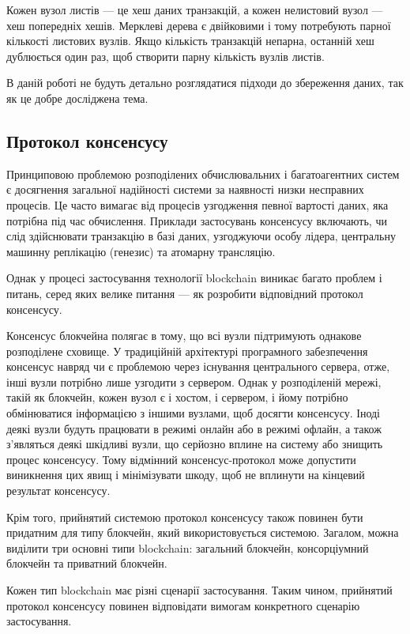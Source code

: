 \documentclass{lib/styles/default-style}
\begin{document}
    Кожен вузол листів --- це хеш даних транзакцій,
    а кожен нелистовий вузол --- хеш попередніх хешів.
    Мерклеві дерева є двійковими і тому потребують парної кількості листових вузлів.
    Якщо кількість транзакцій непарна, останній хеш дублюється один раз,
    щоб створити парну кількість вузлів листів.

    В даній роботі не будуть детально розглядатися підходи до збереження даних, так як це добре досліджена тема.
    
\subsection{Протокол консенсусу}

    Принциповою проблемою розподілених обчислювальних і багатоагентних систем
    є досягнення загальної надійності системи за наявності низки несправних процесів.
    Це часто вимагає від процесів узгодження певної вартості даних, яка потрібна під час обчислення.
    Приклади застосувань консенсусу включають, чи слід здійснювати транзакцію в базі даних, узгоджуючи особу лідера,
    центральну машинну реплікацію (генезис) та атомарну трансляцію.
    
    Однак у процесі застосування технології blockchain виникає багато проблем і питань,
    серед яких велике питання --- як розробити відповідний протокол консенсусу.

    Консенсус блокчейна полягає в тому, що всі вузли підтримують однакове розподілене сховище.
    У традиційній архітектурі програмного забезпечення консенсус навряд чи є проблемою через існування центрального сервера,
    отже, інші вузли потрібно лише узгодити з сервером. Однак у розподіленій мережі, такій як блокчейн, кожен вузол є і хостом,
    і сервером, і йому потрібно обмінюватися інформацією з іншими вузлами, щоб досягти консенсусу. Іноді деякі вузли будуть
    працювати в режимі онлайн або в режимі офлайн, а також з’являться деякі шкідливі вузли, що серйозно вплине на систему або знищить
    процес консенсусу. Тому відмінний консенсус-протокол може допустити виникнення цих явищ і мінімізувати шкоду,
    щоб не вплинути на кінцевий результат консенсусу.
    
    Крім того, прийнятий системою протокол консенсусу
    також повинен бути придатним для типу блокчейн, який використовується системою. Загалом, можна виділити три основні типи blockchain:
    загальний блокчейн, консорціумний блокчейн та приватний блокчейн.
    
    Кожен тип blockchain має різні сценарії застосування.
    Таким чином, прийнятий протокол консенсусу повинен відповідати вимогам конкретного сценарію застосування.
\end{document}
